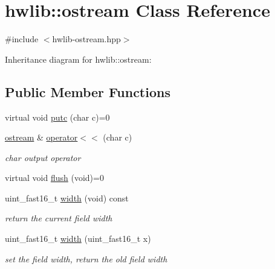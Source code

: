 \hypertarget{classhwlib_1_1ostream}{}\section{hwlib\+:\+:ostream Class Reference}
\label{classhwlib_1_1ostream}


{\ttfamily \#include $<$hwlib-\/ostream.\+hpp$>$}



Inheritance diagram for hwlib\+:\+:ostream\+:
\subsection*{Public Member Functions}
\begin{DoxyCompactItemize}
\item 
virtual void \hyperlink{classhwlib_1_1ostream_a3b2b77c9e933b76bd6ddd85b9883a31b}{putc} (char c)=0
\item 
\mbox{\label{classhwlib_1_1ostream_ab7fd8d969cd3533df36944233da5c64b}} 
\hyperlink{classhwlib_1_1ostream}{ostream} \& \hyperlink{classhwlib_1_1ostream_ab7fd8d969cd3533df36944233da5c64b}{operator$<$$<$} (char c)
\begin{DoxyCompactList}\small\item\em char output operator \end{DoxyCompactList}\item 
virtual void \hyperlink{classhwlib_1_1ostream_a5f43f08159d2733e02805f134598f96a}{flush} (void)=0
\item 
\mbox{\label{classhwlib_1_1ostream_a2b8ee4105056446dd774ce1a47f53911}} 
uint\+\_\+fast16\+\_\+t \hyperlink{classhwlib_1_1ostream_a2b8ee4105056446dd774ce1a47f53911}{width} (void) const
\begin{DoxyCompactList}\small\item\em return the current field width \end{DoxyCompactList}\item 
\mbox{\label{classhwlib_1_1ostream_a10a1f5b0f55eba541b78a1799a37af8d}} 
uint\+\_\+fast16\+\_\+t \hyperlink{classhwlib_1_1ostream_a10a1f5b0f55eba541b78a1799a37af8d}{width} (uint\+\_\+fast16\+\_\+t x)
\begin{DoxyCompactList}\small\item\em set the field width, return the old field width \end{DoxyCompactList}\item 

\end{DoxyCompactItemize}
